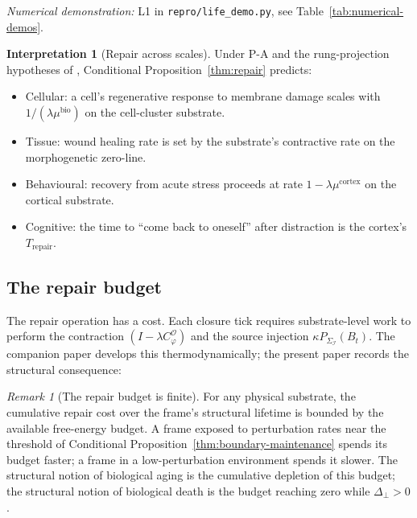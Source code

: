 \documentclass[11pt]{article}
\theoremstyle{plain}
\theoremstyle{definition}
\newtheorem{interpretation}[theorem]{Interpretation}
\theoremstyle{remark}
\newtheorem{remark}[theorem]{Remark}
\newcommand{\Ical}{\mathcal{I}}
\newcommand{\Ocal}{\mathcal{O}}
\newcommand{\Cph}{C_\varphi}
\begin{document}
\noindent\emph{Numerical demonstration:} L1 in \texttt{repro/life\_demo.py}, see Table~\ref{tab:numerical-demos}.


\begin{interpretation}[Repair across scales]\label{int:repair}
Under P-A and the rung-projection hypotheses of \citet{SmartProcessingToPOV}, Conditional Proposition~\ref{thm:repair} predicts:
\begin{itemize}[leftmargin=2em]
\item Cellular: a cell's regenerative response to membrane damage scales with $1/(\lambda \mu^{\mathrm{bio}})$ on the cell-cluster substrate.
\item Tissue: wound healing rate is set by the substrate's contractive rate on the morphogenetic zero-line.
\item Behavioural: recovery from acute stress proceeds at rate $1 - \lambda \mu^{\mathrm{cortex}}$ on the cortical substrate.
\item Cognitive: the time to ``come back to oneself'' after distraction is the cortex's $T_{\mathrm{repair}}$.
\end{itemize}
\end{interpretation}

\subsection{The repair budget}

The repair operation has a cost. Each closure tick requires substrate-level work to perform the contraction $(I - \lambda \Cph^\Ocal)$ and the source injection $\kappa P_{\Sigma_\Ical}(B_t)$. The companion paper \citep{SmartProcessingToPOV} develops this thermodynamically; the present paper records the structural consequence:

\begin{remark}[The repair budget is finite]\label{rem:repair-budget}
For any physical substrate, the cumulative repair cost over the frame's structural lifetime is bounded by the available free-energy budget. A frame exposed to perturbation rates near the threshold of Conditional Proposition~\ref{thm:boundary-maintenance} spends its budget faster; a frame in a low-perturbation environment spends it slower. The structural notion of biological aging is the cumulative depletion of this budget; the structural notion of biological death is the budget reaching zero while $\Delta_\perp > 0$.
\end{remark}

\end{document}
